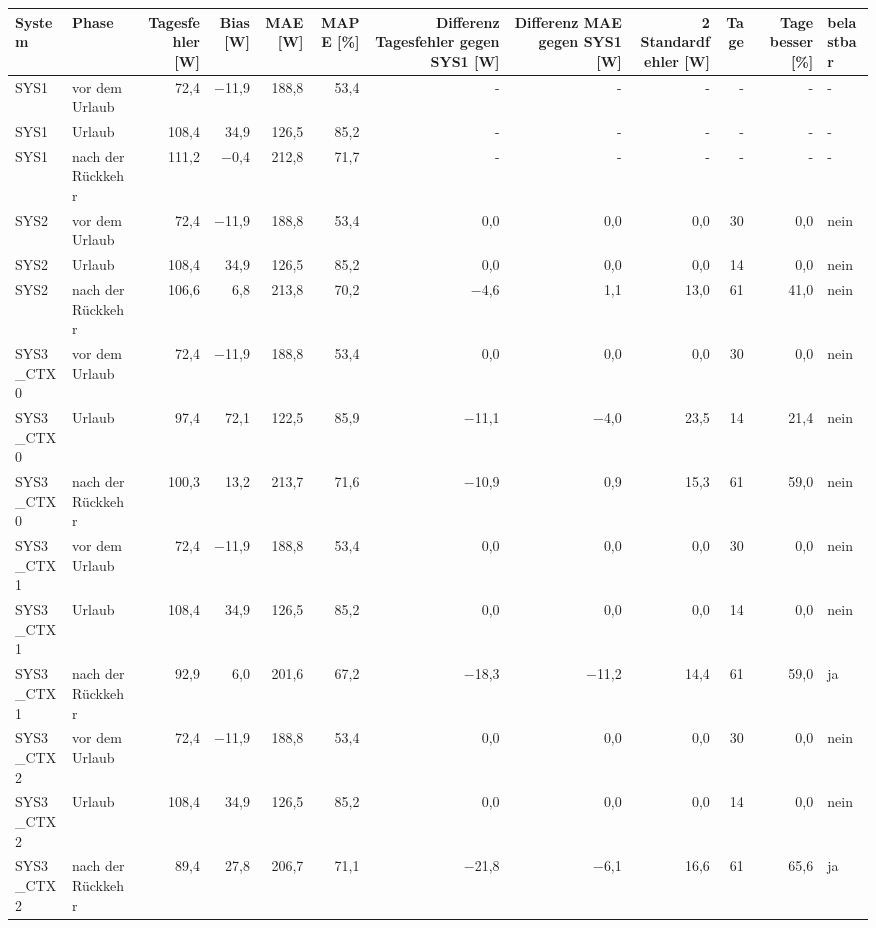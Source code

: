 \begin{tabular}{llrrrrrrrrrl}
\toprule
System & Phase & Tagesfehler [W] & Bias [W] & MAE [W] & MAPE [\%] & Differenz Tagesfehler gegen SYS1 [W] & Differenz MAE gegen SYS1 [W] & 2 Standardfehler [W] & Tage & Tage besser [\%] & belastbar \\
\midrule
SYS1 & vor dem Urlaub & 72,4 & $-$11,9 & 188,8 & 53,4 & - & - & - & - & - & - \\
SYS1 & Urlaub & 108,4 & 34,9 & 126,5 & 85,2 & - & - & - & - & - & - \\
SYS1 & nach der Rückkehr & 111,2 & $-$0,4 & 212,8 & 71,7 & - & - & - & - & - & - \\
SYS2 & vor dem Urlaub & 72,4 & $-$11,9 & 188,8 & 53,4 & 0,0 & 0,0 & 0,0 & 30 & 0,0 & nein \\
SYS2 & Urlaub & 108,4 & 34,9 & 126,5 & 85,2 & 0,0 & 0,0 & 0,0 & 14 & 0,0 & nein \\
SYS2 & nach der Rückkehr & 106,6 & 6,8 & 213,8 & 70,2 & $-$4,6 & 1,1 & 13,0 & 61 & 41,0 & nein \\
SYS3\_CTX0 & vor dem Urlaub & 72,4 & $-$11,9 & 188,8 & 53,4 & 0,0 & 0,0 & 0,0 & 30 & 0,0 & nein \\
SYS3\_CTX0 & Urlaub & 97,4 & 72,1 & 122,5 & 85,9 & $-$11,1 & $-$4,0 & 23,5 & 14 & 21,4 & nein \\
SYS3\_CTX0 & nach der Rückkehr & 100,3 & 13,2 & 213,7 & 71,6 & $-$10,9 & 0,9 & 15,3 & 61 & 59,0 & nein \\
SYS3\_CTX1 & vor dem Urlaub & 72,4 & $-$11,9 & 188,8 & 53,4 & 0,0 & 0,0 & 0,0 & 30 & 0,0 & nein \\
SYS3\_CTX1 & Urlaub & 108,4 & 34,9 & 126,5 & 85,2 & 0,0 & 0,0 & 0,0 & 14 & 0,0 & nein \\
SYS3\_CTX1 & nach der Rückkehr & 92,9 & 6,0 & 201,6 & 67,2 & $-$18,3 & $-$11,2 & 14,4 & 61 & 59,0 & ja \\
SYS3\_CTX2 & vor dem Urlaub & 72,4 & $-$11,9 & 188,8 & 53,4 & 0,0 & 0,0 & 0,0 & 30 & 0,0 & nein \\
SYS3\_CTX2 & Urlaub & 108,4 & 34,9 & 126,5 & 85,2 & 0,0 & 0,0 & 0,0 & 14 & 0,0 & nein \\
SYS3\_CTX2 & nach der Rückkehr & 89,4 & 27,8 & 206,7 & 71,1 & $-$21,8 & $-$6,1 & 16,6 & 61 & 65,6 & ja \\
\bottomrule
\end{tabular}
